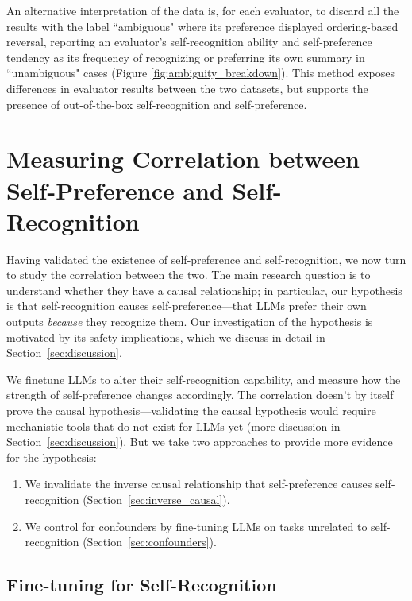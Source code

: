 \documentclass{article}
\theoremstyle{plain}
\theoremstyle{definition}
\theoremstyle{remark}
\begin{document}
An alternative interpretation of the data is, for each evaluator, to discard all the results with the label ``ambiguous" where its preference displayed ordering-based reversal, reporting an evaluator's self-recognition ability and self-preference tendency as its frequency of recognizing or preferring its own summary in ``unambiguous" cases (Figure \ref{fig:ambiguity_breakdown}). This method exposes differences in evaluator results between the two datasets, but supports the presence of out-of-the-box self-recognition and self-preference.


\section{Measuring Correlation between Self-Preference and Self-Recognition}
\label{sec:correlation}

Having validated the existence of self-preference and self-recognition, we now turn to study the correlation between the two.
The main research question is to understand whether they have a causal relationship; in particular, our hypothesis is that self-recognition causes self-preference---that LLMs prefer their own outputs \textit{because} they recognize them.
Our investigation of the hypothesis is motivated by its safety implications, which we discuss in detail in Section~\ref{sec:discussion}.

We finetune LLMs to alter their self-recognition capability, and measure how the strength of self-preference changes accordingly.
The correlation doesn't by itself prove the causal hypothesis---validating the causal hypothesis would require mechanistic tools that do not exist for LLMs yet (more discussion in Section~\ref{sec:discussion}).
But we take two approaches to provide more evidence for the hypothesis:

\begin{enumerate}
    \item We invalidate the inverse causal relationship that self-preference causes self-recognition (Section~\ref{sec:inverse_causal}).
    \item We control for confounders by fine-tuning LLMs on tasks unrelated to self-recognition (Section~\ref{sec:confounders}).
\end{enumerate}

\subsection{Fine-tuning for Self-Recognition}
\label{sec:finetuning}
\end{document}

